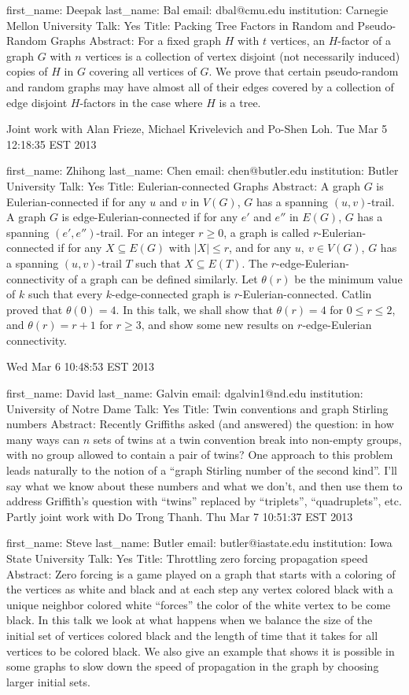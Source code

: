 \documentclass{article}
\begin{document}
first_name: Deepak
last_name: Bal
email: dbal@cmu.edu
institution: Carnegie Mellon University
Talk: Yes
Title: Packing Tree Factors in Random and Pseudo-Random Graphs
Abstract: For a fixed graph $H$ with $t$ vertices, an $H$-factor of a graph $G$ with $n$ vertices is a collection of vertex disjoint (not necessarily induced) copies of $H$ in $G$ covering all vertices of $G$.  We prove that certain pseudo-random and random graphs may have almost all of their edges covered by a collection of edge disjoint $H$-factors in the case where $H$ is a tree.

Joint work with Alan Frieze, Michael Krivelevich and Po-Shen Loh.
Tue Mar  5 12:18:35 EST 2013

first_name: Zhihong
last_name: Chen
email: chen@butler.edu
institution: Butler University
Talk: Yes
Title: Eulerian-connected Graphs
Abstract: A graph $G$ is Eulerian-connected if for any $u$ and $v$ in $V(G)$, $G$ has a spanning $(u,v)$-trail.
A graph $G$ is edge-Eulerian-connected if for any $e'$ and $e''$ in $E(G)$, $G$ has a spanning $(e',e'')$-trail.
For an integer $r\ge 0$, a graph is called $r$-Eulerian-connected if for any $X\subseteq E(G)$ with $|X|\le r$,
and for any $u,\ v \in V(G)$,
$G$ has a spanning $(u,v)$-trail $T$ such that $X\subseteq E(T)$. The $r$-edge-Eulerian-connectivity of a graph can be defined similarly.
 Let $\theta (r)$ be the minimum value of $k$ such
that every $k$-edge-connected graph is $r$-Eulerian-connected.
 Catlin proved that $\theta(0)=4$. In this talk, we shall show that $\theta(r)=4$ for $0\le r\le 2$, and $\theta(r)=r+1$ for $r\ge 3$, and show
 some new results on $r$-edge-Eulerian connectivity.

Wed Mar  6 10:48:53 EST 2013

first_name: David
last_name: Galvin
email: dgalvin1@nd.edu
institution: University of Notre Dame
Talk: Yes
Title: Twin conventions and graph Stirling numbers
Abstract: Recently Griffiths asked (and answered) the question: in how many ways can $n$ sets of twins at a twin convention break into non-empty groups, with no group allowed to contain a pair of twins? One approach to this problem leads naturally to the notion of a ``graph Stirling number of the second kind''. I'll say what we know about these numbers and what we don't, and then use them to address Griffith's question with ``twins'' replaced by ``triplets'', ``quadruplets'', etc. Partly joint work with Do Trong Thanh.
Thu Mar  7 10:51:37 EST 2013

first_name: Steve
last_name: Butler
email: butler@iastate.edu
institution: Iowa State University
Talk: Yes
Title: Throttling zero forcing propagation speed
Abstract: Zero forcing is a game played on a graph that starts with a coloring of the vertices as white and black and at each step any vertex colored black with a unique neighbor colored white ``forces'' the color of the white vertex to be come black.  In this talk we look at what happens when we balance the size of the initial set of vertices colored black and the length of time that it takes for all vertices to be colored black.  We also give an example that shows it is possible in some graphs to slow down the speed of propagation in the graph by choosing larger initial sets.
\end{document}
